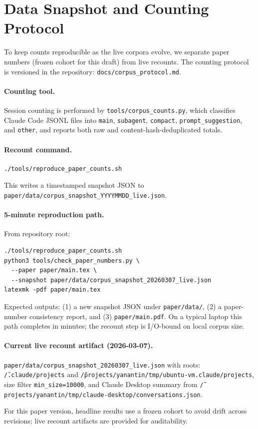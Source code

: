 \appendix
\section{Data Snapshot and Counting Protocol}
\label{sec:appendix-protocol}

To keep counts reproducible as the live corpora evolve, we separate
paper numbers (frozen cohort for this draft) from live recounts.
The counting protocol is versioned in the repository:
\texttt{docs/corpus\_protocol.md}.

\paragraph{Counting tool.}
Session counting is performed by
\texttt{tools/corpus\_counts.py}, which classifies Claude Code JSONL
files into \texttt{main}, \texttt{subagent}, \texttt{compact},
\texttt{prompt\_suggestion}, and \texttt{other}, and reports both
raw and content-hash-deduplicated totals.

\paragraph{Recount command.}
\begin{verbatim}
./tools/reproduce_paper_counts.sh
\end{verbatim}
This writes a timestamped snapshot JSON to
\texttt{paper/data/corpus\_snapshot\_YYYYMMDD\_live.json}.

\paragraph{5-minute reproduction path.}
From repository root:
\begin{verbatim}
./tools/reproduce_paper_counts.sh
python3 tools/check_paper_numbers.py \
  --paper paper/main.tex \
  --snapshot paper/data/corpus_snapshot_20260307_live.json
latexmk -pdf paper/main.tex
\end{verbatim}
Expected outputs: (1) a new snapshot JSON under \texttt{paper/data/},
(2) a paper-number consistency report, and (3) \texttt{paper/main.pdf}.
On a typical laptop this path completes in minutes; the recount step is
I/O-bound on local corpus size.

\paragraph{Current live recount artifact (2026-03-07).}
\texttt{paper/data/corpus\_snapshot\_20260307\_live.json}
with roots:
\texttt{\~/.claude/projects} and
\texttt{\~/projects/yanantin/tmp/ubuntu-vm.claude/projects},
size filter \texttt{min\_size=10000}, and Claude Desktop summary
from \texttt{\~/projects/yanantin/tmp/claude-desktop/conversations.json}.

For this paper version, headline results use a frozen cohort to
avoid drift across revisions; live recount artifacts are provided for
auditability.

